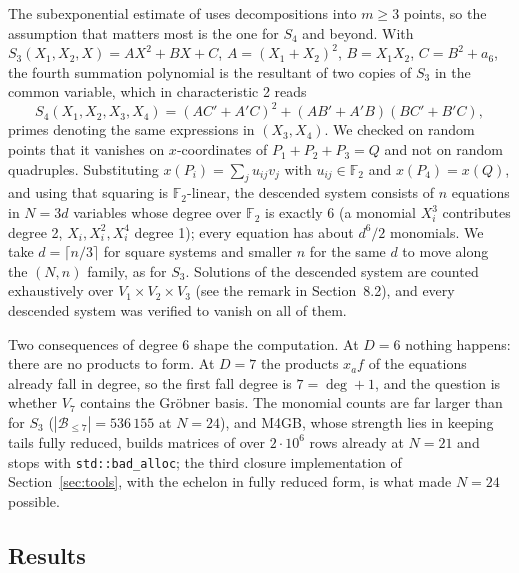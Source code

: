 \documentclass[11pt,a4paper]{article}
\theoremstyle{remark}\newtheorem{remark}{Remark}
\newcommand{\F}{\mathbb{F}}
\newcommand{\B}{\mathcal{B}}
\begin{document}
The subexponential estimate of \cite{PQ12} uses decompositions into $m\ge3$ points, so the assumption that matters most is the one for $S_4$ and beyond. With $S_3(X_1,X_2,X)=AX^2+BX+C$, $A=(X_1+X_2)^2$, $B=X_1X_2$, $C=B^2+a_6$, the fourth summation polynomial is the resultant of two copies of $S_3$ in the common variable, which in characteristic 2 reads
\[
S_4(X_1,X_2,X_3,X_4)=(AC'+A'C)^2+(AB'+A'B)(BC'+B'C),
\]
primes denoting the same expressions in $(X_3,X_4)$. We checked on random points that it vanishes on $x$-coordinates of $P_1+P_2+P_3=Q$ and not on random quadruples. Substituting $x(P_i)=\sum_j u_{ij}v_j$ with $u_{ij}\in\F_2$ and $x(P_4)=x(Q)$, and using that squaring is $\F_2$-linear, the descended system consists of $n$ equations in $N=3d$ variables whose degree over $\F_2$ is exactly 6 (a monomial $X_i^3$ contributes degree 2, $X_i,X_i^2,X_i^4$ degree 1); every equation has about $d^6/2$ monomials. We take $d=\lceil n/3\rceil$ for square systems and smaller $n$ for the same $d$ to move along the $(N,n)$ family, as for $S_3$. Solutions of the descended system are counted exhaustively over $V_1\times V_2\times V_3$ (see the remark in Section~8.2), and every descended system was verified to vanish on all of them.

Two consequences of degree 6 shape the computation. At $D=6$ nothing happens: there are no products to form. At $D=7$ the products $x_af$ of the equations already fall in degree, so the first fall degree is $7=\deg+1$, and the question is whether $V_7$ contains the Gröbner basis. The monomial counts are far larger than for $S_3$ ($|\B_{\le7}|=536\,155$ at $N=24$), and M4GB, whose strength lies in keeping tails fully reduced, builds matrices of over $2\cdot10^6$ rows already at $N=21$ and stops with \texttt{std::bad\_alloc}; the third closure implementation of Section~\ref{sec:tools}, with the echelon in fully reduced form, is what made $N=24$ possible.

\subsection{Results}
\end{document}
